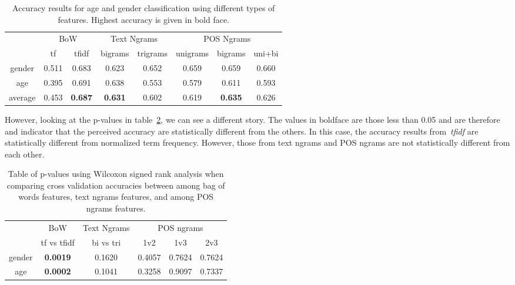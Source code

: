 \documentclass[a4paper]{llncs}
\begin{document}
\begin{table}[!htbp]
\centering
\begin{tabular}{|c|cc|cc|ccc|}
\hline
\multicolumn{1}{|l|}{\multirow{2}{*}{}} & \multicolumn{2}{c|}{BoW} & \multicolumn{2}{c|}{Text Ngrams} & \multicolumn{3}{c|}{POS Ngrams}    \\ \cline{2-8} 
\multicolumn{1}{|l|}{}                  & tf     & tfidf           & bigrams        & trigrams        & unigrams & bigrams        & uni+bi \\ \hline
gender                                  & 0.511  & 0.683           & 0.623          & 0.652           & 0.659    & 0.659          & 0.660  \\ 
age                                     & 0.395  & 0.691           & 0.638          & 0.553           & 0.579    & 0.611          & 0.593  \\ \hline
average                                 & 0.453  & \textbf{0.687}  & \textbf{0.631}          & 0.602           & 0.619    & \textbf{0.635} & 0.626  \\ \hline
\end{tabular}
\caption{Accuracy results for age and gender classification using different types of features. Highest accuracy is given in bold face.}
\label{table:DiffFeaturesResults}
\end{table}

However, looking at the p-values in table~\ref{table:PValDiffFeaturesResults}, we can see a different story. The values in boldface are those less than 0.05 and are therefore and indicator that the perceived accuracy are statistically different from the others. In this case, the accuracy results from~\textit{tfidf} are statistically different from normalized term frequency. However, those from text ngrams and POS ngrams are not statistically different from each other. 

\begin{table}[!htbp]
\centering
\begin{tabular}{|l|c|c|ccc|}
\hline
\multirow{2}{*}{}            & BoW             & Text Ngrams & \multicolumn{3}{c|}{POS ngrams} \\ \cline{2-6} 
                             & tf vs tfidf     & bi vs tri   & 1v2       & 1v3      & 2v3      \\ \hline
\multicolumn{1}{|c|}{gender} & \textbf{0.0019} & 0.1620      & 0.4057    & 0.7624   & 0.7624   \\ \hline
\multicolumn{1}{|c|}{age}    & \textbf{0.0002} & 0.1041      & 0.3258    & 0.9097   & 0.7337   \\ \hline
\end{tabular}
\caption{Table of p-values using Wilcoxon signed rank analysis when comparing cross
validation accuracies between among bag of words features, text ngrams features, and among POS ngrams features.}
\label{table:PValDiffFeaturesResults}
\end{table}
\end{document}
